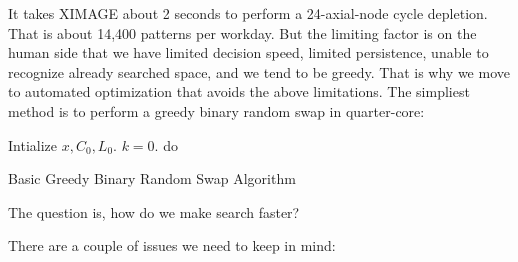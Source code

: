 \documentclass{school-22.211-notes}
\begin{document}
\clearpage


It takes XIMAGE about 2 seconds to perform a 24-axial-node cycle
depletion. That is about 14,400 patterns per workday. But the limiting
factor is on the human side that we have limited decision speed,
limited persistence, unable to recognize already searched space, and
we tend to be greedy. That is why we move to automated optimization
that avoids the above limitations. The simpliest method is to perform
a greedy binary random swap in quarter-core:


\begin{algorithm}
  \begin{algorithmic}
    \STATE Intialize $x, C_0, L_0$.  $k=0$. 
    \STATE do 
    \ENDWHILE
  \end{algorithmic}
  \caption{Basic Greedy Binary Random Swap Algorithm}
\end{algorithm}

The question is, how do we make search faster? 

There are a couple of issues we need to keep in mind: 
\end{document}
